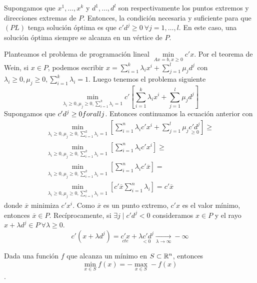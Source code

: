 \documentclass[PM.tex]{subfiles}
\begin{document}
\begin{theorem} Supongamos que $x^1,\dots ,x^k$ y $d^1,\dots ,d^l$ son respectivamente los puntos extremos y direcciones extremas de $P$. Entonces, la condición necesaria y suficiente para que $(PL)$ tenga solución óptima es que $c'd^j\geq 0\ \forall j=1,\dots, l$. En este caso, una solución óptima siempre se alcanza en un vértice de $P$.
\end{theorem}
\begin{dem}
Planteamos el problema de programación lineal $\underset{Ax=b,x\geq 0}{\min} c'x$. Por el teorema de Wein, si $x\in P$, podemos escribir $x=\sum_{i=1}^k\lambda_ix^i +\sum_{j=1}^l\mu_j d^j$ con $\lambda_i\geq 0, \mu_j\geq 0, \sum_{i=1}^k\lambda_i=1$. Luego tenemos el problema siguiente
\[\underset{\lambda_i\geq 0, \mu_j\geq 0, \sum_{i=1}^k\lambda_i=1}{\min} c'[\sum_{i=1}^k\lambda_ix^i +\sum_{j=1}^l\mu_j d^j] \]
Supongamos que $c'd^j\geq 0\\forall j$. Entonces continuamos la ecuación anterior con 
\begin{gather*}
 \underset{\lambda_i\geq 0, \mu_j\geq 0, \sum_{i=1}^k\lambda_i=1}{\min} [\sum_{i=1}^n\lambda_ic'x^i +\sum_{j=1}^l\mu_j \underset{\geq 0}{c'd^j}]\geq\\
\underset{\lambda_i\geq 0, \mu_j\geq 0, \sum_{i=1}^k\lambda_i=1}{\min} [\sum_{i=1}^n\lambda_ic'x^i]\geq \\
\underset{\lambda_i\geq 0, \mu_j\geq 0, \sum_{i=1}^k\lambda_i=1}{\min} [\sum_{i=1}^n\lambda_ic'\overline{x}]=\\
\underset{\lambda_i\geq 0, \mu_j\geq 0, \sum_{i=1}^k\lambda_i=1}{\min} [c'\overline{x}\sum_{i=1}^n\lambda_i]=c'\overline{x}
\end{gather*}
donde $\overline{x}$ minimiza $c'x^i$. Como $\overline{x}$ es un punto extremo, $c'x$ es el valor mínimo, entonces $\overline{x}\in P$. Recíprocamente, si $\exists j\mid c'd^j<0$ consideramos $x\in P$ y el rayo $x+\lambda d^j\in P\ \forall\lambda\geq 0$. 
\[ c'(x+\lambda d^j)=\underset{cte}{c'x} + \underset{<0}{\lambda c' d^j}\underset{\lambda\to\infty}{\longrightarrow} -\infty\]
\end{dem}

\begin{nota}
Dada una función $f$ que alcanza un mínimo en $S\subset\mathbb{R}^n$, entonces \[\min_{x\in S} f(x)= -\max_{x\in S}-f(x)\].
\end{nota}
\end{document}
